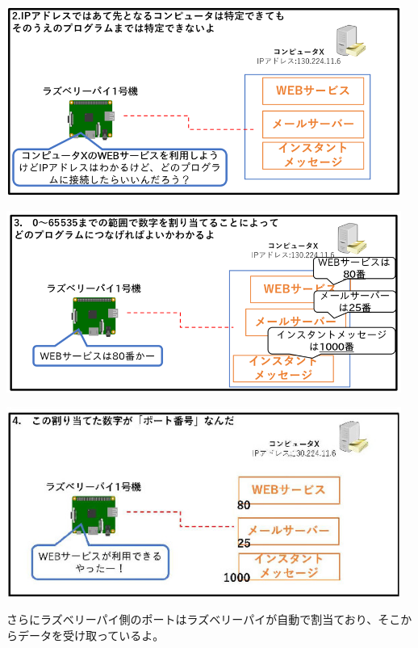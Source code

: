 \documentclass[a4paper,12pt,dvipdfmx]{jarticle}
\begin{document}
\centering
\includegraphics[width=0.97\textwidth]{ome7-img022.png}
\flushleft


\bigskip

\clearpage

\centering
\includegraphics[width=0.97\textwidth]{ome7-img023.png}



\centering
\includegraphics[width=0.97\textwidth]{ome7-img024}
\flushleft


\bigskip


\bigskip


\bigskip

さらにラズベリーパイ側のポートはラズベリーパイが自動で割当ており、そこからデータを受け取っているよ。


\bigskip
\end{document}
